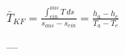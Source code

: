 \( \bar{T}_{KF} = \frac{\int_{ein}^{aus} T \, ds}{s_{aus} - s_{ein}} = \frac{h_a - h_e}{T_a - T_e} \)  

---